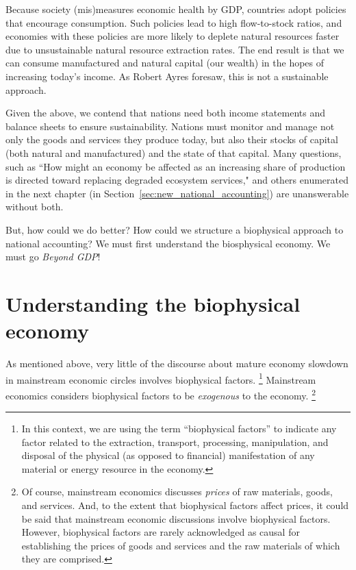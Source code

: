 Because society (mis)measures economic health by GDP, 
countries adopt policies that encourage consumption.
Such policies lead to high flow-to-stock ratios,
and economies with these policies are more likely to deplete natural resources faster
due to unsustainable natural resource extraction rates.
The end result is that we can consume manufactured and natural capital (our wealth) 
in the hopes of increasing today's income. 
As Robert Ayres foresaw, this is not 
a sustainable approach.

Given the above, we contend that nations need both 
income statements and
balance sheets
to ensure sustainability. 
Nations must monitor and manage not only the goods and services they produce today, 
but also their stocks of capital (both natural and manufactured)
and the state of that capital. 
Many questions, such as 
``How might an economy be affected as an increasing share of production
is directed toward replacing 
degraded ecosystem services," 
and others enumerated in the next chapter (in Section~\ref{sec:new_national_accounting})
are unanswerable without both.

But, how could we do better? 
How could we structure a biophysical approach to national accounting?
We must first understand the biosphysical economy.
We must go \emph{Beyond GDP}!


\section{Understanding the biophysical economy}
\label{sec:exogenous_factors}

As mentioned above, 
very little of the discourse 
about mature economy slowdown 
in mainstream economic circles
involves biophysical factors.%
	\footnote{
	In this context, we are using the term ``biophysical factors''
	to indicate any factor related to 
	the extraction, transport, processing, manipulation, and disposal 
	of the physical (as opposed to financial) manifestation 
	of any material or energy resource in the economy.
	}
Mainstream economics considers biophysical factors
to be \emph{exogenous} to the economy.%
	\footnote{
	Of course, mainstream economics discusses \emph{prices}
	of raw materials, goods, and services. 
	And, to the extent that biophysical factors affect prices,
	it could be said that mainstream economic discussions involve
	biophysical factors.
	However, biophysical factors are rarely acknowledged as causal 
	for establishing the prices of goods and services and the raw materials 
	of which they are comprised.
	}


